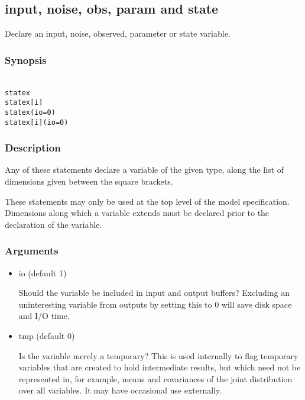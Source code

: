 \subsection{{\sf input}, {\sf noise}, {\sf obs}, {\sf param} and {\sf state}\label{var}}

Declare an input, noise, observed, parameter or state variable.

\subsubsection*{Synopsis\label{var_Synopsis}}

\begin{alltt}{\sf
    state x
    state x[i]
    state x(io = 0)
    state x[i](io = 0)
}\end{alltt}

\subsubsection*{Description\label{var_Description}}

Any of these statements declare a variable of the given type, along the list
of dimensions given between the square brackets.

These statements may only be used at the top level of the model
specification. Dimensions along which a variable extends must be declared
prior to the declaration of the variable.

\subsubsection*{Arguments\label{var_Arguments}}

\begin{itemize}
\item \textsf{io} (default 1)

Should the variable be included in input and output buffers? Excluding an
uninteresting variable from outputs by setting this to 0 will save disk space
and I/O time.

\item \textsf{tmp} (default 0)

Is the variable merely a temporary? This is used internally to flag
temporary variables that are created to hold intermediate results, but which
need not be represented in, for example, means and covariances of the joint
distribution over all variables. It may have occasional use externally.

\end{itemize}

